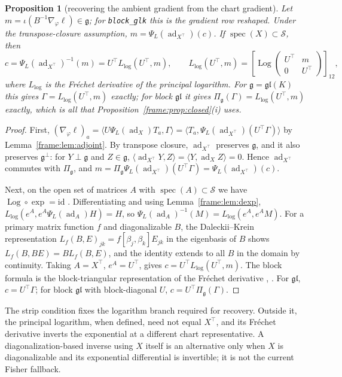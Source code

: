 \documentclass[11pt]{article}
\newtheorem{proposition}[theorem]{Proposition}
\theoremstyle{definition}
\theoremstyle{remark}
\providecommand{\gl}{\mathfrak{gl}}
\providecommand{\ad}{\operatorname{ad}}
\providecommand{\g}{\mathfrak{g}}
\providecommand{\Log}{\operatorname{Log}}
\providecommand{\spec}{\operatorname{spec}}
\providecommand{\ip}[2]{\langle #1, #2\rangle}
\begin{document}
\begin{proposition}[recovering the ambient gradient from the chart gradient]\label{frame:prop:recovery}
Let $m=\iota(B^{-1}\nabla_\varphi\ell)\in\g$; for \texttt{block\_glk} this is the gradient row reshaped. Under the transpose-closure assumption, $m=\Psi_L(\ad_{X^\top})(c)$. If $\spec(X)\subset\mathcal{S}$, then
\begin{equation}\label{frame:eq:recovery}
c=\Psi_L(\ad_{X^\top})^{-1}(m)=U^\top L_{\log}(U^\top,m),\qquad L_{\log}(U^\top,m)=\left[\Log\begin{pmatrix}U^\top&m\\0&U^\top\end{pmatrix}\right]_{12},
\end{equation}
where $L_{\log}$ is the Fr\'echet derivative of the principal logarithm. For $\g=\gl(K)$ this gives $\Gamma=L_{\log}(U^\top,m)$ exactly; for block $\gl$ it gives $\Pi_\g(\Gamma)=L_{\log}(U^\top,m)$ exactly, which is all that Proposition~\ref{frame:prop:closed}(i) uses.
\end{proposition}
\begin{proof}
First, $(\nabla_\varphi\ell)_a=\ip{U\Psi_L(\ad_X)T_a}{\Gamma}=\ip{T_a}{\Psi_L(\ad_{X^\top})(U^\top\Gamma)}$ by Lemma~\ref{frame:lem:adjoint}. By transpose closure, $\ad_{X^\top}$ preserves $\g$, and it also preserves $\g^\perp$: for $Y\perp\g$ and $Z\in\g$, $\ip{\ad_{X^\top}Y}{Z}=\ip{Y}{\ad_XZ}=0$. Hence $\ad_{X^\top}$ commutes with $\Pi_\g$, and $m=\Pi_\g\Psi_L(\ad_{X^\top})(U^\top\Gamma)=\Psi_L(\ad_{X^\top})(c)$.

Next, on the open set of matrices $A$ with $\spec(A)\subset\mathcal{S}$ we have $\Log\circ\exp=\mathrm{id}$ \cite[Thm.~1.31]{frame:Higham2008}. Differentiating and using Lemma~\ref{frame:lem:dexp}, $L_{\log}(e^A,e^A\Psi_L(\ad_A)H)=H$, so $\Psi_L(\ad_A)^{-1}(M)=L_{\log}(e^A,e^AM)$. For a primary matrix function $f$ and diagonalizable $B$, the Daleckii--Krein representation $L_f(B,E)_{jk}=f[\beta_j,\beta_k]E_{jk}$ in the eigenbasis of $B$ shows $L_f(B,BE)=BL_f(B,E)$, and the identity extends to all $B$ in the domain by continuity. Taking $A=X^\top$, $e^A=U^\top$, gives $c=U^\top L_{\log}(U^\top,m)$. The block formula is the block-triangular representation of the Fr\'echet derivative \cite{frame:Mathias1996}, \cite[Thm.~3.6]{frame:Higham2008}. For $\gl$, $c=U^\top\Gamma$; for block $\gl$ with block-diagonal $U$, $c=U^\top\Pi_\g(\Gamma)$.
\end{proof}

The strip condition fixes the logarithm branch required for recovery. Outside it, the principal logarithm, when defined, need not equal \(X^\top\), and its Fr\'echet derivative inverts the exponential at a different chart representative. A diagonalization-based inverse using \(X\) itself is an alternative only when \(X\) is diagonalizable and its exponential differential is invertible; it is not the current Fisher fallback.
\end{document}
